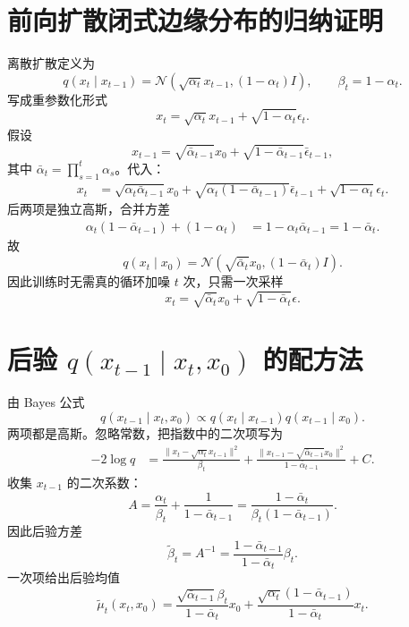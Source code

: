 \documentclass[UTF8,12pt,a4paper,fontset=none]{ctexart}
\numberwithin{equation}{section}
\begin{document}
\section{前向扩散闭式边缘分布的归纳证明}
离散扩散定义为
\begin{equation}
 q(x_t\mid x_{t-1})=
 \mathcal N\left(\sqrt{\alpha_t}x_{t-1},(1-\alpha_t)I\right),
 \qquad \beta_t=1-\alpha_t.
\end{equation}
写成重参数化形式
\begin{equation}
 x_t=\sqrt{\alpha_t}x_{t-1}+\sqrt{1-\alpha_t}\epsilon_t.
\end{equation}
假设
\begin{equation}
 x_{t-1}=\sqrt{\bar\alpha_{t-1}}x_0+
 \sqrt{1-\bar\alpha_{t-1}}\bar\epsilon_{t-1},
\end{equation}
其中 $\bar\alpha_t=\prod_{s=1}^{t}\alpha_s$。代入：
\begin{align}
 x_t
 &=\sqrt{\alpha_t\bar\alpha_{t-1}}x_0
 +\sqrt{\alpha_t(1-\bar\alpha_{t-1})}\bar\epsilon_{t-1}
 +\sqrt{1-\alpha_t}\epsilon_t.
\end{align}
后两项是独立高斯，合并方差
\begin{align}
 \alpha_t(1-\bar\alpha_{t-1})+(1-\alpha_t)
 &=1-\alpha_t\bar\alpha_{t-1}=1-\bar\alpha_t.
\end{align}
故
\begin{equation}
 \boxed{q(x_t\mid x_0)=
 \mathcal N\left(\sqrt{\bar\alpha_t}x_0,
 (1-\bar\alpha_t)I\right).}
\end{equation}
因此训练时无需真的循环加噪 $t$ 次，只需一次采样
\begin{equation}
 x_t=\sqrt{\bar\alpha_t}x_0+
 \sqrt{1-\bar\alpha_t}\epsilon.
\end{equation}

\section{后验 $q(x_{t-1}\mid x_t,x_0)$ 的配方法}
由 Bayes 公式
\begin{equation}
 q(x_{t-1}\mid x_t,x_0)
 \propto q(x_t\mid x_{t-1})q(x_{t-1}\mid x_0).
\end{equation}
两项都是高斯。忽略常数，把指数中的二次项写为
\begin{align}
 -2\log q
 &=\frac{\|x_t-\sqrt{\alpha_t}x_{t-1}\|^2}{\beta_t}
 +\frac{\|x_{t-1}-\sqrt{\bar\alpha_{t-1}}x_0\|^2}
 {1-\bar\alpha_{t-1}}+C.
\end{align}
收集 $x_{t-1}$ 的二次系数：
\begin{equation}
 A=\frac{\alpha_t}{\beta_t}+
 \frac1{1-\bar\alpha_{t-1}}
 =\frac{1-\bar\alpha_t}{\beta_t(1-\bar\alpha_{t-1})}.
\end{equation}
因此后验方差
\begin{equation}
 \widetilde\beta_t=A^{-1}
 =\frac{1-\bar\alpha_{t-1}}{1-\bar\alpha_t}\beta_t.
\end{equation}
一次项给出后验均值
\begin{equation}
 \widetilde\mu_t(x_t,x_0)=
 \frac{\sqrt{\bar\alpha_{t-1}}\beta_t}{1-\bar\alpha_t}x_0
 +\frac{\sqrt{\alpha_t}(1-\bar\alpha_{t-1})}{1-\bar\alpha_t}x_t.
\end{equation}
\end{document}
